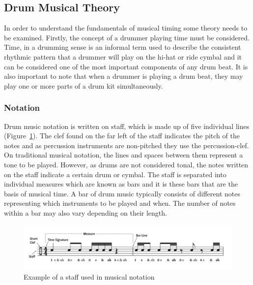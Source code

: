\documentclass[a4paper, 11pt]{article}
\begin{document}
\subsection{Drum Musical Theory}
In order to understand the fundamentals of musical timing some theory needs to be examined. Firstly, the concept of a drummer playing time must be considered. Time, in a drumming sense is an informal term used to describe the consistent rhythmic pattern that a drummer will play on the hi-hat or ride cymbal \cite{drum-bible} and it can be considered one of the most important components of any drum beat. It is also important to note that when a drummer is playing a drum beat, they may play one or more parts of a drum kit simultaneously.  

\subsubsection{Notation}
Drum music notation is written on staff, which is made up of five individual lines (Figure~\ref{fig: staff}). The clef found on the far left of the staff indicates the pitch of the notes \cite{oxford-comp} and as percussion instruments are non-pitched they use the percussion-clef. On traditional musical notation, the lines and spaces between them represent a tone to be played. However, as drums are not considered tonal, the notes written on the staff indicate a certain drum or cymbal. The staff is separated into individual measures which are known as bars \cite{drum-note} and it is these bars that are the basis of musical time. A bar of drum music typically consists of different notes representing which instruments to be played and when. The number of notes within a bar may also vary depending on their length. 

\begin{figure}[h]
	\centering
	\includegraphics[scale=0.3]{images/staff.jpg}
	\caption{Example of a staff used in musical notation \cite{drum-note}}
	\label{fig: staff}
\end{figure}
\end{document}
